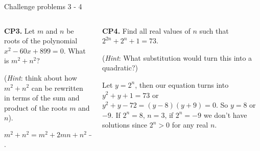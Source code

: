 \documentclass[9pt,aspectratio=169,handout]{beamer}
\begin{document}
\begin{frame}{Challenge problems 3 - 4}
  \begin{columns}[T]
    \begin{column}{0.5\textwidth}
      \begin{problem}
        \textbf{CP3.} Let $m$ and $n$ be roots of the polynomial $x^2 - 60x + 899 = 0.$  What is $m^2 + n^2$? 
        
        (\emph{Hint}: think about how $m^2 + n^2$ can be rewritten in terms of the sum and product of the roots $m$ and $n$).
      \end{problem}

      $m^2 + n^2 = m^2 + 2mn + n^2 - 2mn = (m + n)^2 - 2mn = (60)^2 - 2\cdot 899 = 3600 - 1798 = \boxed{1802}$.
    \end{column}
    \begin{column}{0.5\textwidth}
      \begin{problem}
        \textbf{CP4.} Find all real values of $n$ such that $2^{2n} + 2^n + 1 = 73$.  
        
        (\emph{Hint}:  What substitution would turn this into a quadratic?)
      \end{problem}
      Let $y = 2^n$, then our equation turns into $y^2 + y + 1 = 73$ or $y^2 + y - 72 = (y - 8)(y + 9) = 0$. So $y = 8$ or $-9$. If $2^n = 8$, $n = \boxed{3}$, if $2^n = -9$ we don't have solutions since $2^n > 0$ for any real $n$.
    \end{column}
  \end{columns}
\end{frame}

\end{document}
